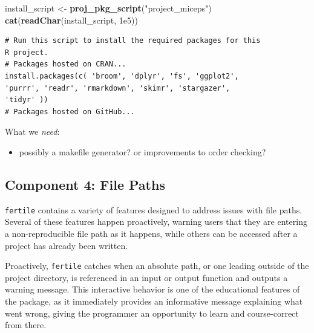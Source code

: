 \documentclass[12pt,twoside]{reedthesis}
\newenvironment{Shaded}{\begin{snugshade}}{\end{snugshade}}
\newcommand{\KeywordTok}[1]{\textcolor[rgb]{0.13,0.29,0.53}{\textbf{#1}}}
\newcommand{\FloatTok}[1]{\textcolor[rgb]{0.00,0.00,0.81}{#1}}
\newcommand{\StringTok}[1]{\textcolor[rgb]{0.31,0.60,0.02}{#1}}
\newcommand{\NormalTok}[1]{#1}
\providecommand{\tightlist}{%
  \setlength{\itemsep}{0pt}\setlength{\parskip}{0pt}}
\begin{document}
\footnotesize
\begin{Shaded}
\begin{Highlighting}[]
\NormalTok{install_script <-}\StringTok{ }\KeywordTok{proj_pkg_script}\NormalTok{(}\StringTok{"project_miceps"}\NormalTok{)}
\KeywordTok{cat}\NormalTok{(}\KeywordTok{readChar}\NormalTok{(install_script, }\FloatTok{1e5}\NormalTok{))}
\end{Highlighting}
\end{Shaded}
\begin{verbatim}
# Run this script to install the required packages for this
R project.
# Packages hosted on CRAN...
install.packages(c( 'broom', 'dplyr', 'fs', 'ggplot2',
'purrr', 'readr', 'rmarkdown', 'skimr', 'stargazer',
'tidyr' ))
# Packages hosted on GitHub...
\end{verbatim}
\normalsize

What we \emph{need}:
\begin{itemize}
\tightlist
\item
  possibly a makefile generator? or improvements to order checking?
\end{itemize}
\subsection{Component 4: File Paths}\label{component-4-file-paths}

\texttt{fertile} contains a variety of features designed to address
issues with file paths. Several of these features happen proactively,
warning users that they are entering a non-reproducible file path as it
happens, while others can be accessed after a project has already been
written.

Proactively, \texttt{fertile} catches when an absolute path, or one
leading outside of the project directory, is referenced in an input or
output function and outputs a warning message. This interactive behavior
is one of the educational features of the package, as it immediately
provides an informative message explaining what went wrong, giving the
programmer an opportunity to learn and course-correct from there.
\end{document}
